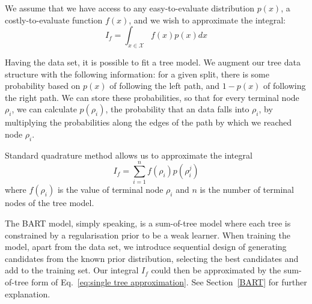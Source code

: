 We assume that we have access to any easy-to-evaluate distribution $p(x)$, a costly-to-evaluate function $f(x)$,
and we wish to approximate the integral:
\begin{equation}
	I_f = \int_{x \in \mathcal{X}} f(x) p(x) dx
\label{eq:integral}
\end{equation}

Having the data set, it is possible to fit a tree model. We augment our tree data structure with the following information: for a given split, there is some probability based on $p(x)$ of following the left path, and $1-p(x)$ of following the right path. We can store these probabilities, so that for every terminal node $\rho_i$, we can calculate $p(\rho_i)$, the probability that an data falls into $\rho_i$, by multiplying the probabilities along the edges of the path by which we reached node $\rho_i$.

Standard quadrature method \cite{BQ} allows us to approximate the integral
\begin{equation}
	I_f = \sum_{i=1}^{n} f(\rho_i)p(\rho_i^j)
\label{eq:single tree approximation}
\end{equation}
where $f(\rho_i)$ is the value of terminal node $\rho_i$ and $n$ is the number of terminal nodes of the tree model.

The BART model, simply speaking, is a sum-of-tree model where each tree is constrained by a regularisation prior to be a weak learner. \cite{BART} When training the model, apart from the data set, we introduce sequential design of generating candidates from the known prior distribution, selecting the best candidates and add to the training set. Our integral $I_f$ could then be approximated by the sum-of-tree form of Eq.~\eqref{eq:single tree approximation}. See Section~\ref{BART} for further explanation.